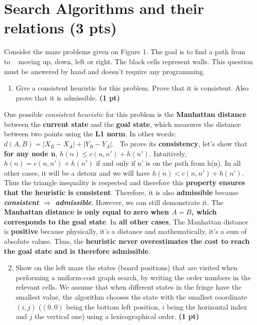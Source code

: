 \documentclass[11pt,a4paper]{report}
\begin{document}
\maketitle

\section{Search Algorithms and their relations (3 pts)}
Consider the maze problems given on Figure 1. The goal is to find a path from \Gentsroom ~ to \EURhv ~ moving up, down, left or right. The black cells represent walls. This question must be answered by hand and doesn't require any programming.

\begin{enumerate}
\item Give a consistent heuristic for this problem. Prove that it is consistent. Also prove that it is admissible. \textbf{(1 pt)}
\end{enumerate}

\begin{answers}[4cm]
\small{One possible \textit{consistent heuristic} for this problem is the \textbf{Manhattan distance} between the \textbf{current state} and the \textbf{goal state}, which measures the distance between two points using the \textbf{L1 norm}. In other words: \\ \textbf{$d(A, B) = \lvert X_B - X_A \rvert + \lvert Y_B - Y_A \rvert$}. \
To prove its \textbf{consistency}, let's show that \textbf{for any node n}, $h(n)\leq c(n, n') + h(n')$. Intuitively, $h(n) = c(n, n') + h(n')$ if and only if n' is on the path from h(n). In all other cases, it will be a detour and we will have $h(n) < c(n, n') + h(n')$. Thus the triangle inequality is respected and therefore this \textbf{property ensures that the heuristic is consistent}. Therefore, it is also \textbf{admissible} because \textbf{\textit{consistent $\Rightarrow$ admissible}}. However, we can still demonstrate it. The \textbf{Manhattan distance is only equal to zero when $A = B$, which corresponds to the goal state}. In \textbf{all other cases}, The Manhattan distance is \textbf{positive} because physically, it's a distance and mathematically, it's a sum of absolute values. Thus, the \textbf{heuristic never overestimates the cost to reach the goal state and is therefore admissible}.}
\end{answers}


\begin{enumerate}
\setcounter{enumi}{1}
\item Show on the left maze the states (board positions) that
are visited when performing a uniform-cost graph search, by writing the order numbers in the relevant cells. We assume that when different states in the fringe have the smallest value, the algorithm chooses the state with the smallest coordinate $(i,j)$ ($(0,0)$ being the bottom left position, $i$ being the horizontal index and $j$ the vertical one) using a lexicographical order. \textbf{(1 pt)}
\end{enumerate}
\end{document}
